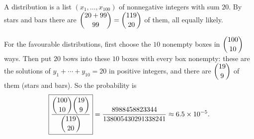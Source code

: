 A distribution is a list $(x_1,\dots,x_{100})$ of nonnegative integers with sum $20$. By stars and bars there are $\dbinom{20+99}{99}=\dbinom{119}{20}$ of them, all equally likely.

For the favourable distributions, first choose the $10$ nonempty boxes in $\dbinom{100}{10}$ ways. Then put $20$ bows into these $10$ boxes with every box nonempty: these are the solutions of $y_1+\cdots+y_{10}=20$ in positive integers, and there are $\dbinom{19}{9}$ of them (stars and bars). So the probability is
\[\boxed{\dfrac{\dbinom{100}{10}\dbinom{19}{9}}{\dbinom{119}{20}}}=\dfrac{8988458823344}{138005430291338241}\approx6.5\times10^{-5}.\]

